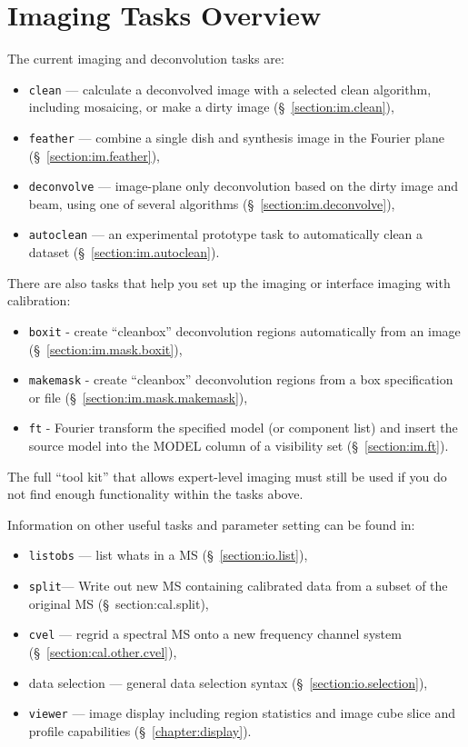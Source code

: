 \section{Imaging Tasks Overview}
\label{section:im.tasks}

The current imaging and deconvolution tasks are:
\begin{itemize}
   \item {\tt clean} --- calculate a deconvolved image with a selected clean
         algorithm, including mosaicing, or make a dirty image
         (\S~\ref{section:im.clean}),
   \item {\tt feather} --- combine a single dish and synthesis image in the
         Fourier plane (\S~\ref{section:im.feather}),
   \item {\tt deconvolve} --- image-plane only deconvolution based on
         the dirty image and beam, using one of several algorithms
         (\S~\ref{section:im.deconvolve}),
   \item {\tt autoclean} --- an experimental prototype task to
         automatically clean a dataset
         (\S~\ref{section:im.autoclean}).
\end{itemize}

There are also tasks that help you set up the imaging or interface
imaging with calibration:

\begin{itemize}
   \item {\tt boxit} - create ``cleanbox'' deconvolution regions automatically
         from an image
	 (\S~\ref{section:im.mask.boxit}),
   \item {\tt makemask} - create ``cleanbox'' deconvolution regions
         from a box specification or file (\S~\ref{section:im.mask.makemask}),
   \item {\tt ft} - Fourier transform the specified model (or component
         list) and insert the source model into the MODEL column of a
         visibility set (\S~\ref{section:im.ft}).
\end{itemize}

The full ``tool kit'' that allows expert-level imaging must still be
used if you do not find enough functionality within the tasks above. 

Information on other useful tasks and parameter setting can be found in:
\begin{itemize}
   \item {\tt listobs} --- list whats in a MS (\S~\ref{section:io.list}),
   \item {\tt split}--- Write out new MS containing calibrated data
      from a subset of the original MS (\S~{section:cal.split}),
   \item {\tt cvel} --- regrid a spectral MS onto a new frequency
      channel system
      (\S~\ref{section:cal.other.cvel}),
   \item data selection --- general data selection syntax
      (\S~\ref{section:io.selection}),
   \item {\tt viewer} --- image display including region statistics and
         image cube slice and profile capabilities
         (\S~\ref{chapter:display}).
\end{itemize}

